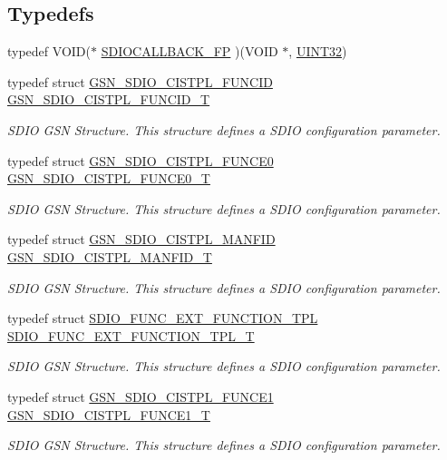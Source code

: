 \subsection*{Typedefs}
\begin{DoxyCompactItemize}
\item 
typedef VOID($\ast$ \hyperlink{a00584_ac80005f1e9ff1e1e884583938336474b}{SDIOCALLBACK\_\-FP} )(VOID $\ast$, \hyperlink{a00660_gae1e6edbbc26d6fbc71a90190d0266018}{UINT32})
\item 
typedef struct \hyperlink{a00221}{GSN\_\-SDIO\_\-CISTPL\_\-FUNCID} \hyperlink{a00653_ga6ed752facb495193a30f5e53dfa13490}{GSN\_\-SDIO\_\-CISTPL\_\-FUNCID\_\-T}
\begin{DoxyCompactList}\small\item\em SDIO GSN Structure. This structure defines a SDIO configuration parameter. \end{DoxyCompactList}\item 
typedef struct \hyperlink{a00219}{GSN\_\-SDIO\_\-CISTPL\_\-FUNCE0} \hyperlink{a00653_ga9437621f0901955674de851edfc146b0}{GSN\_\-SDIO\_\-CISTPL\_\-FUNCE0\_\-T}
\begin{DoxyCompactList}\small\item\em SDIO GSN Structure. This structure defines a SDIO configuration parameter. \end{DoxyCompactList}\item 
typedef struct \hyperlink{a00222}{GSN\_\-SDIO\_\-CISTPL\_\-MANFID} \hyperlink{a00653_gab74bdd813aab97891c103a24000c5131}{GSN\_\-SDIO\_\-CISTPL\_\-MANFID\_\-T}
\begin{DoxyCompactList}\small\item\em SDIO GSN Structure. This structure defines a SDIO configuration parameter. \end{DoxyCompactList}\item 
typedef struct \hyperlink{a00458}{SDIO\_\-FUNC\_\-EXT\_\-FUNCTION\_\-TPL} \hyperlink{a00653_ga3df33f78e69366f3c3feccb1b2ca27c4}{SDIO\_\-FUNC\_\-EXT\_\-FUNCTION\_\-TPL\_\-T}
\begin{DoxyCompactList}\small\item\em SDIO GSN Structure. This structure defines a SDIO configuration parameter. \end{DoxyCompactList}\item 
typedef struct \hyperlink{a00220}{GSN\_\-SDIO\_\-CISTPL\_\-FUNCE1} \hyperlink{a00653_gaad08d4da003d74eb8301281f67bdde39}{GSN\_\-SDIO\_\-CISTPL\_\-FUNCE1\_\-T}
\begin{DoxyCompactList}\small\item\em SDIO GSN Structure. This structure defines a SDIO configuration parameter. \end{DoxyCompactList}\item 

\end{DoxyCompactItemize}
